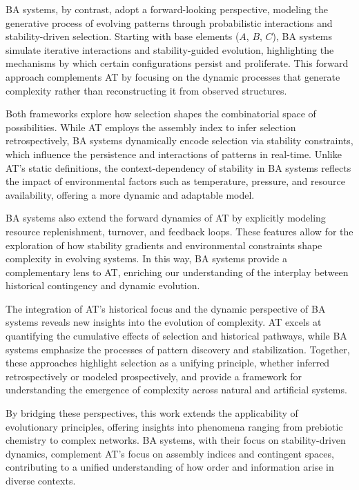 \documentclass[entropy,article,submit,pdftex,oneauthor]{Definitions/mdpi}
\begin{document}
BA systems, by contrast, adopt a forward-looking perspective, modeling the generative process of evolving patterns through probabilistic interactions and stability-driven selection. Starting with base elements ($A$, $B$, $C$), BA systems simulate iterative interactions and stability-guided evolution, highlighting the mechanisms by which certain configurations persist and proliferate. This forward approach complements AT by focusing on the dynamic processes that generate complexity rather than reconstructing it from observed structures.

Both frameworks explore how selection shapes the combinatorial space of possibilities. While AT employs the assembly index to infer selection retrospectively, BA systems dynamically encode selection via stability constraints, which influence the persistence and interactions of patterns in real-time. Unlike AT’s static definitions, the context-dependency of stability in BA systems reflects the impact of environmental factors such as temperature, pressure, and resource availability, offering a more dynamic and adaptable model.

BA systems also extend the forward dynamics of AT by explicitly modeling resource replenishment, turnover, and feedback loops. These features allow for the exploration of how stability gradients and environmental constraints shape complexity in evolving systems. In this way, BA systems provide a complementary lens to AT, enriching our understanding of the interplay between historical contingency and dynamic evolution.

The integration of AT’s historical focus and the dynamic perspective of BA systems reveals new insights into the evolution of complexity. AT excels at quantifying the cumulative effects of selection and historical pathways, while BA systems emphasize the processes of pattern discovery and stabilization. Together, these approaches highlight selection as a unifying principle, whether inferred retrospectively or modeled prospectively, and provide a framework for understanding the emergence of complexity across natural and artificial systems.

By bridging these perspectives, this work extends the applicability of evolutionary principles, offering insights into phenomena ranging from prebiotic chemistry to complex networks. BA systems, with their focus on stability-driven dynamics, complement AT’s focus on assembly indices and contingent spaces, contributing to a unified understanding of how order and information arise in diverse contexts.
\end{document}
